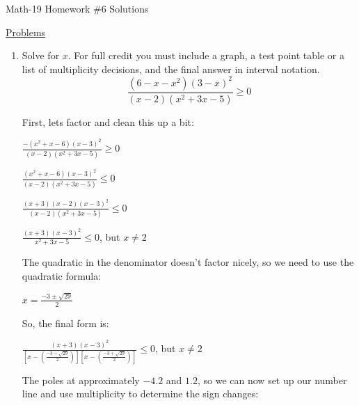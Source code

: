 \documentclass[letterpaper,12pt,fleqn]{article}
\begin{document}
\begin{center}
\Large Math-19 Homework \#6 Solutions
\end{center}

\vspace{0.5in}

\underline{Problems}

\begin{enumerate}
\item Solve for $x$. For full credit you must include a graph, a test point
  table or a list of multiplicity decisions, and the final answer in interval
  notation.
  \[\frac{(6-x-x^2)(3-x)^2}{(x-2)(x^2+3x-5)}\ge0\]

  First, lets factor and clean this up a bit:

  $\frac{-(x^2+x-6)(x-3)^2}{(x-2)(x^2+3x-5)}\ge0$

  $\frac{(x^2+x-6)(x-3)^2}{(x-2)(x^2+3x-5)}\le0$

  $\frac{(x+3)(x-2)(x-3)^2}{(x-2)(x^2+3x-5)}\le0$

  $\frac{(x+3)(x-3)^2}{x^2+3x-5}\le0$, but $x\ne2$

  The quadratic in the denominator doesn't factor nicely, so we need to use
  the quadratic formula:

  $x=\frac{-3\pm\sqrt{29}}{2}$

  So, the final form is:
  
  $\frac{(x+3)(x-3)^2}
  {[x-(\frac{-3-\sqrt{29}}{2})][x-(\frac{-3+\sqrt{29}}{2})]}\le0$, but $x\ne2$

  The poles at approximately $-4.2$ and $1.2$, so we can now set up our
  number line and use multiplicity to determine the sign changes:

  \bigskip



\end{enumerate}
\end{document}
